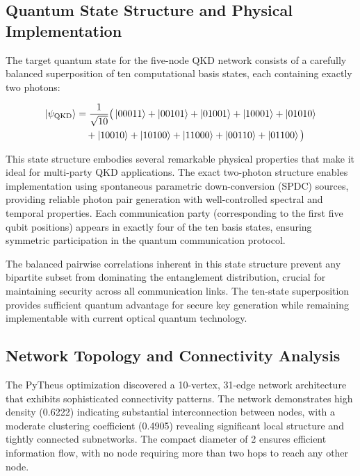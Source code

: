 \documentclass[11pt,a4paper]{article}
\begin{document}
\subsection{Quantum State Structure and Physical Implementation}

The target quantum state for the five-node QKD network consists of a carefully balanced superposition of ten computational basis states, each containing exactly two photons:

\begin{align}
\ket{\psi_{\text{QKD}}} &= \frac{1}{\sqrt{10}} \big( \ket{00011} + \ket{00101} + \ket{01001} + \ket{10001} + \ket{01010} \nonumber \\
&\quad + \ket{10010} + \ket{10100} + \ket{11000} + \ket{00110} + \ket{01100} \big)
\end{align}

This state structure embodies several remarkable physical properties that make it ideal for multi-party QKD applications. The exact two-photon structure enables implementation using spontaneous parametric down-conversion (SPDC) sources, providing reliable photon pair generation with well-controlled spectral and temporal properties. Each communication party (corresponding to the first five qubit positions) appears in exactly four of the ten basis states, ensuring symmetric participation in the quantum communication protocol.

The balanced pairwise correlations inherent in this state structure prevent any bipartite subset from dominating the entanglement distribution, crucial for maintaining security across all communication links. The ten-state superposition provides sufficient quantum advantage for secure key generation while remaining implementable with current optical quantum technology.

\subsection{Network Topology and Connectivity Analysis}

The PyTheus optimization discovered a 10-vertex, 31-edge network architecture that exhibits sophisticated connectivity patterns. The network demonstrates high density (0.6222) indicating substantial interconnection between nodes, with a moderate clustering coefficient (0.4905) revealing significant local structure and tightly connected subnetworks. The compact diameter of 2 ensures efficient information flow, with no node requiring more than two hops to reach any other node.
\end{document}
